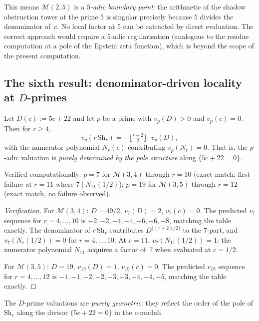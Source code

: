\documentclass[11pt]{article}
\newcommand{\cM}{\mathcal{M}}
\begin{document}
This means $\cM(2,5)$ is a \emph{$5$-adic boundary point}: the
arithmetic of the shadow obstruction tower at the prime $5$ is singular
precisely because $5$ divides the denominator of~$c$.  No local
factor at $5$ can be extracted by direct evaluation.  The
correct approach would require a $5$-adic regularisation
(analogous to the residue computation at a pole of the Epstein
zeta function), which is beyond the scope of the present
computation.

\subsection*{The sixth result: denominator-driven locality at
$D$-primes}

\begin{proposition}
\label{prop:D-prime-locality}
Let $D(c) := 5c + 22$ and let $p$ be a prime with
$v_p(D) > 0$ and $v_p(c) = 0$.  Then for $r \ge 4$,
\[
v_p(r\,\mathrm{Sh}_r)
= -\bigl\lfloor\tfrac{r-2}{2}\bigr\rfloor \cdot v_p(D),
\]
with the numerator polynomial $N_r(c)$ contributing
$v_p(N_r) = 0$.  That is, the $p$-adic valuation is
\emph{purely determined by the pole structure} along
$\{5c + 22 = 0\}$.

Verified computationally: $p = 7$ for $\cM(3,4)$ through
$r = 10$ \textup{(}exact match; first failure at $r = 11$
where $7 \mid N_{11}(1/2)$\textup{)};
$p = 19$ for $\cM(3,5)$ through $r = 12$ \textup{(}exact
match, no failure observed\textup{)}.
\end{proposition}

\begin{proof}[Verification]
For $\cM(3,4)$: $D = 49/2$, $v_7(D) = 2$, $v_7(c) = 0$.
The predicted $v_7$ sequence for $r = 4,\ldots,10$ is
$-2,-2,-4,-4,-6,-6,-8$, matching the table exactly.
The denominator of $r\,\mathrm{Sh}_r$ contributes
$D^{\lfloor(r-2)/2\rfloor}$ to the $7$-part, and
$v_7(N_r(1/2)) = 0$ for $r = 4, \ldots, 10$.
At $r = 11$, $v_7(N_{11}(1/2)) = 1$: the numerator
polynomial $N_{11}$ acquires a factor of~$7$ when evaluated
at $c = 1/2$.

For $\cM(3,5)$: $D = 19$, $v_{19}(D) = 1$, $v_{19}(c) = 0$.
The predicted $v_{19}$ sequence for $r = 4,\ldots,12$ is
$-1,-1,-2,-2,-3,-3,-4,-4,-5$, matching the table exactly.
\end{proof}

The $D$-prime valuations are \emph{purely geometric}: they
reflect the order of the pole of $\mathrm{Sh}_r$ along the
divisor $\{5c + 22 = 0\}$ in the $c$-moduli.
\end{document}
